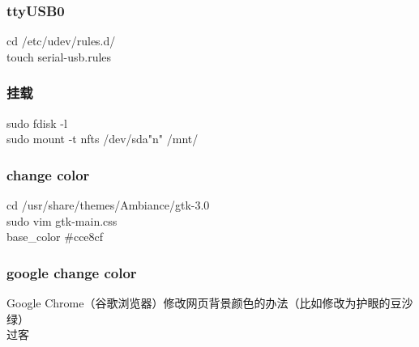 \documentclass{beamer}
\newcommand{\quotes}[1]{"#1"}
\begin{document}
\begin{CJK}{UTF8}{gkai}
    \begin{frame}\frametitle{ttyUSB0}
        cd /etc/udev/rules.d/ \\
        touch serial-usb.rules\\
    \end{frame}

    \begin{frame}\frametitle{挂载}
        sudo fdisk -l\\
        sudo mount -t nfts /dev/sda\quotes{n} /mnt/
    \end{frame}

    \begin{frame}\frametitle{change color}
        cd /usr/share/themes/Ambiance/gtk-3.0\\ %
        sudo vim gtk-main.css\\
        base\_color \#cce8cf\\
    \end{frame}

    \begin{frame}\frametitle{google change color}
        Google Chrome（谷歌浏览器）修改网页背景颜色的办法（比如修改为护眼的豆沙绿）  \\
        过客\\
    \end{frame}




\end{CJK}
\end{document}
